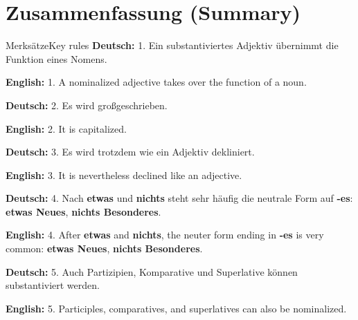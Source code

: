 \documentclass[a4paper,11pt]{article}
\newcommand{\GermanText}[1]{\textbf{Deutsch: }#1\par}
\newcommand{\EnglishText}[1]{{\small\color{SoftGray}\textbf{English: }#1\par}}
\begin{document}
\section{Zusammenfassung \textnormal{(Summary)}}
\begin{grammarentry}{Merksätze}{Key rules}
\GermanText{1. Ein substantiviertes Adjektiv übernimmt die Funktion eines Nomens.}
\EnglishText{1. A nominalized adjective takes over the function of a noun.}
\GermanText{2. Es wird großgeschrieben.}
\EnglishText{2. It is capitalized.}
\GermanText{3. Es wird trotzdem wie ein Adjektiv dekliniert.}
\EnglishText{3. It is nevertheless declined like an adjective.}
\GermanText{4. Nach \textbf{etwas} und \textbf{nichts} steht sehr häufig die neutrale Form auf \textbf{-es}: \textbf{etwas Neues}, \textbf{nichts Besonderes}.}
\EnglishText{4. After \textbf{etwas} and \textbf{nichts}, the neuter form ending in \textbf{-es} is very common: \textbf{etwas Neues}, \textbf{nichts Besonderes}.}
\GermanText{5. Auch Partizipien, Komparative und Superlative können substantiviert werden.}
\EnglishText{5. Participles, comparatives, and superlatives can also be nominalized.}
\end{grammarentry}
\end{document}
